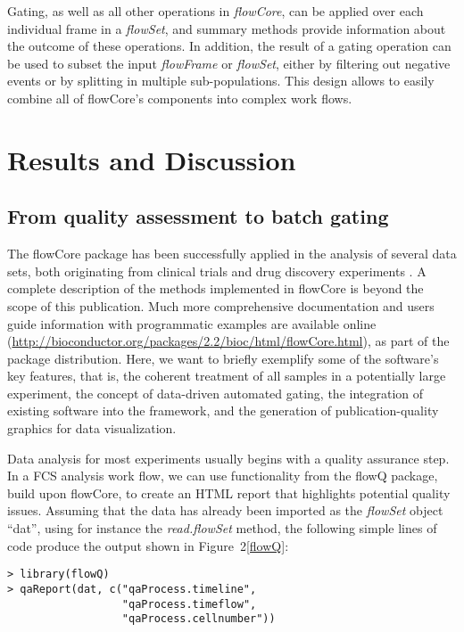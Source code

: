 \documentclass[10pt]{bmc_article}
\newcommand{\Rpackage}[1]{{\textsf{#1}}}
\newcommand{\Rclass}[1]{{\textit{#1}}}
\newenvironment{bmcformat}{\begin{raggedright}\baselineskip20pt\sloppy\setboolean{publ}{false}}{\end{raggedright}\baselineskip20pt\sloppy}
\begin{document}
\begin{bmcformat}
Gating, as well as all other operations in \Rclass{flowCore}, can be
applied over each individual frame in a \Rclass{flowSet}, and summary
methods provide information about the outcome of these operations. In
addition, the result of a gating operation can be used to subset the
input \Rclass{flowFrame} or \Rclass{flowSet}, either by filtering out
negative events or by splitting in multiple sub-populations. This
design allows to easily combine all of \Rpackage{flowCore}'s
components into complex work flows.

\section*{Results and Discussion}
\subsection*{From quality assessment to batch gating}
The \Rpackage{flowCore} package has been successfully applied in the
analysis of several data sets, both originating from clinical trials
\cite{brinkman2007hcf} and drug discovery experiments
\cite{gasparetto2004ice}. A complete description of the methods
implemented in \Rpackage{flowCore} is beyond the scope of this
publication.  Much more comprehensive documentation and users guide
information with programmatic examples are available online
(\url{http://bioconductor.org/packages/2.2/bioc/html/flowCore.html}),
as part of the package distribution. Here, we want to briefly
exemplify some of the software's key features, that is, the coherent
treatment of all samples in a potentially large experiment, the
concept of data-driven automated gating, the integration of existing
software into the framework, and the generation of publication-quality
graphics for data visualization.

Data analysis for most experiments usually begins with a quality
assurance step. In a FCS analysis work flow, we can use functionality
from the \Rpackage{flowQ} package, build upon \Rpackage{flowCore}, to
create an HTML report that highlights potential quality
issues. Assuming that the data has already been imported as the
\Rclass{flowSet} object ``dat'', using for instance the
\Rclass{read.flowSet} method, the following simple lines of code
produce the output shown in Figure~2\ref{flowQ}:

\begin{verbatim}
> library(flowQ)
> qaReport(dat, c("qaProcess.timeline", 
                  "qaProcess.timeflow", 
                  "qaProcess.cellnumber"))
\end{verbatim}


\end{bmcformat}
\end{document}
